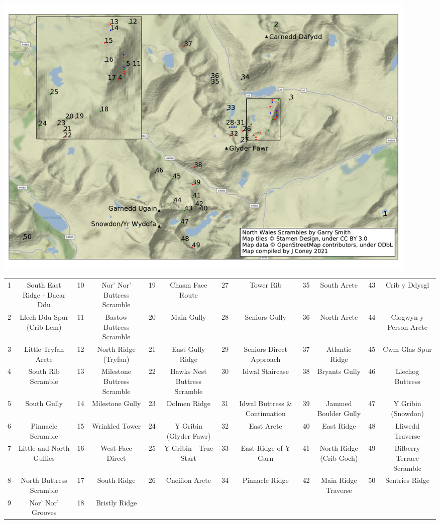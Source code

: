 \documentclass{article}
\begin{document}
\begin{centering}
\includegraphics[width=210mm]{scrambles_summits.pdf}

\tiny
\begin{tabular}{cc|cc|cc|cc|cc|cc}
1&	South East Ridge - Daear Ddu &	10	&Nor' Nor' Buttress Scramble&	19&	Chasm Face Route&	27&	Tower Rib&	35&	South Arete	&43&	Crib y Ddysgl\\
2&	Llech Ddu Spur (Crib Lem)&	11&	Bastow Buttress Scramble&	20&	Main Gully&	28&	Seniors Gully&	36&	North Arete&	44&	Clogwyn y Person Arete\\
3&	Little Tryfan Arete&	12&	North Ridge (Tryfan)&	21&	East Gully Ridge&	29&	Seniors Direct Approach&	37&	Atlantic Ridge&	45&	Cwm Glas Spur\\
4&	South Rib Scramble&	13&	Milestone Buttress Scramble&	22&	Hawks Nest Buttress Scramble&	30&	Idwal Staircase&	38&	Bryants Gully&	46&	Llechog Buttress\\
5&	South Gully	&14&	Milestone Gully	&23&	Dolmen Ridge&	31&	Idwal Buttress \& Continuation&	39&	Jammed Boulder Gully&	47&	Y Gribin (Snowdon)\\
6&	Pinnacle Scramble&	15&	Wrinkled Tower&	24&	Y Gribin (Glyder Fawr)&	32&	East Arete&	40&	East Ridge&	48&	Lliwedd Traverse\\
7&	Little and North Gullies&	16&	West Face Direct&	25&	Y Gribin - True Start&	33&	East Ridge of Y Garn&	41&	North Ridge (Crib Goch)&	49&	Bilberry Terrace Scramble\\
8&	North Buttress Scramble&	17	&South Ridge	&26&	Cneifion Arete	&34	&Pinnacle Ridge	&42	&Main Ridge Traverse	&50&	Sentries Ridge\\
9&	Nor' Nor' Grooves&	18&	Bristly Ridge\\

\end{tabular}

\end{centering}
\end{document}
